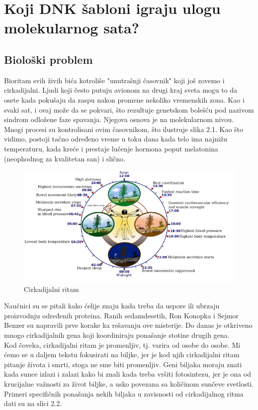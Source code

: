 \chapter{Koji DNK šabloni igraju ulogu molekularnog sata?}
\section{Biološki problem}

Bioritam svih živih bića kotroliše "unutrašnji časovnik" koji još zovemo i cirkadijalni. Ljudi koji često putuju avionom na drugi kraj sveta mogu to da osete kada pokušaju da zaspu nakon promene nekoliko vremenskih zona. Kao i svaki sat, i ovaj može da se pokvari, što rezultuje genetskom bolešću pod nazivom sindrom odložene faze spavanja. Njegova osnova je na molekularnom nivou. Mnogi procesi su kontrolisani ovim časovnikom, što ilustruje slika 2.1. Kao što vidimo, postoji tačno određeno vreme u toku dana kada telo ima najnižu temperaturu, kada kreće i prestaje lučenje hormona poput melatonina (neophodnog za kvalitetan san) i slično.

\begin{figure}[h]
\caption{Cirkadijalni ritam}
\centering
\includegraphics[width=1.1\textwidth]{poglavlja/2/slike/12cut.PNG}
\end{figure}

Naučnici su se pitali kako ćelije znaju kada treba da uspore ili ubrzaju proizvodnju određenih proteina. Ranih sedamdesetih, Ron Konopka i Sejmor Benzer su napravili prve korake ka rešavanju ove misterije. Do danas je otkriveno mnogo cirkadijalnih gena koji koordiniraju ponašanje stotine drugih gena. \\
\indent Kod čoveka, cirkadijalni ritam je promenljiv, tj. varira od osobe do osobe. Mi ćemo se u daljem tekstu fokusirati na biljke, jer je kod njih cirkadijalni ritam pitanje života i smrti, stoga ne sme biti promenljiv. Geni biljaka moraju znati kada sunce izlazi i zalazi kako bi znali kada treba vršiti fotosintezu, jer je ona od krucijalne važnosti za život biljke, a usko povezana sa količinom sunčeve svetlosti. Primeri specifičnih ponašanja nekih biljaka u zavisnosti od cirkadijalnog ritma dati su na slici 2.2.

